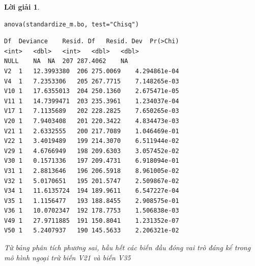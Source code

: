 \documentclass[14pt, a4paper]{article}
\theoremstyle{sltheorem}
\theoremstyle{soltheorem}
\newtheorem*{loigiai}{Lời giải}
\begin{document}
\begin{loigiai}
    \begin{verbatim}
anova(standardize_m.bo, test="Chisq")
    \end{verbatim}

    \begin{verbatim}
Df	Deviance	Resid. Df	Resid. Dev	Pr(>Chi)
<int>	<dbl>	<int>	<dbl>	<dbl>
NULL	NA	NA	207	287.4062	NA
V2	1	12.3993380	206	275.0069	4.294861e-04
V4	1	7.2353306	205	267.7715	7.148265e-03
V10	1	17.6355013	204	250.1360	2.675471e-05
V11	1	14.7399471	203	235.3961	1.234037e-04
V17	1	7.1135689	202	228.2825	7.650265e-03
V20	1	7.9403408	201	220.3422	4.834473e-03
V21	1	2.6332555	200	217.7089	1.046469e-01
V22	1	3.4019489	199	214.3070	6.511944e-02
V29	1	4.6766949	198	209.6303	3.057452e-02
V30	1	0.1571336	197	209.4731	6.918094e-01
V31	1	2.8813646	196	206.5918	8.961005e-02
V32	1	5.0170651	195	201.5747	2.509867e-02
V34	1	11.6135724	194	189.9611	6.547227e-04
V35	1	1.1156477	193	188.8455	2.908575e-01
V36	1	10.0702347	192	178.7753	1.506838e-03
V49	1	27.9711885	191	150.8041	1.231352e-07
V50	1	5.2407937	190	145.5633	2.206321e-02
    \end{verbatim}

    Từ bảng phân tích phương sai, hầu hết các biến đầu đóng vai trò đáng kể trong mô hình ngoại trừ biến V21 và biến V35


\end{loigiai}
\end{document}
